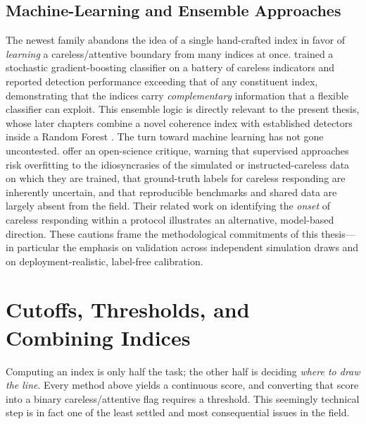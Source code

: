 \documentclass[doc,11pt,donotrepeattitle]{apa7}
\begin{document}
\subsection{Machine-Learning and Ensemble Approaches}

The newest family abandons the idea of a single hand-crafted index in favor of
\emph{learning} a careless/attentive boundary from many indices at once.
\textcite{schroeders2022detecting} trained a stochastic gradient-boosting
classifier on a battery of careless indicators and reported detection
performance exceeding that of any constituent index, demonstrating that the
indices carry \emph{complementary} information that a flexible classifier can
exploit. This ensemble logic is directly relevant to the present thesis, whose
later chapters combine a novel coherence index with established detectors inside
a Random Forest \parencite{breiman2001random}. The turn toward machine learning
has not gone uncontested. \textcite{alfons2024openscience} offer an
open-science critique, warning that supervised approaches risk overfitting to
the idiosyncrasies of the simulated or instructed-careless data on which they
are trained, that ground-truth labels for careless responding are inherently
uncertain, and that reproducible benchmarks and shared data are largely absent
from the field. Their related work on identifying the \emph{onset} of careless
responding within a protocol \parencite{welz2023onset} illustrates an
alternative, model-based direction. These cautions frame the methodological
commitments of this thesis---in particular the emphasis on validation across
independent simulation draws and on deployment-realistic, label-free
calibration.

\section{Cutoffs, Thresholds, and Combining Indices}

Computing an index is only half the task; the other half is deciding \emph{where
to draw the line}. Every method above yields a continuous score, and converting
that score into a binary careless/attentive flag requires a threshold. This
seemingly technical step is in fact one of the least settled and most
consequential issues in the field.
\end{document}
